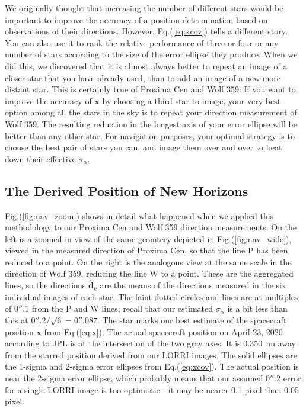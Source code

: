 \documentclass[]{aastex63}
\newcommand{\BV}[1]{\mathbf{#1}}
\newcommand{\BH}[1]{\hat{\mathbf{#1}}}
\begin{document}
We originally thought that increasing the number of different stars would be important to improve the accuracy of a position determination based on observations of their directions.  However, Eq.(\ref{eq:xcov}) tells a different story.  You can also use it to rank the relative performance of three or four or any number of stars according to the size of the error ellipse they produce.  When we did this, we discovered that it is almost always better to repeat an image of a closer star that you have already used, than to add an image of a new more distant star.  This is certainly true of Proxima Cen and Wolf 359: If you want to improve the accuracy of $\BV{x}$ by choosing a third star to image, your very best option among all the stars in the sky is to repeat your direction measurement of Wolf 359.  The resulting reduction in the longest axis of your error ellipse will be better than any other star.  For navigation purposes, your optimal strategy is to choose the best pair of stars you can, and image them over and over to beat down their effective $\sigma_\alpha.$

\subsection{The Derived Position of New Horizons}

Fig.(\ref{fig:nav_zoom}) shows in detail what happened when we applied this methodology to our Proxima Cen and Wolf 359 direction measurements.  On the left is a zoomed-in view of the same geomtery depicted in Fig.(\ref{fig:nav_wide}), viewed in the measured direction of Proxima Cen, so that the line P has been reduced to a point.  On the right is the analogous view at the same scale in the direction of Wolf 359, reducing the line W to a point.  These are the aggregated lines, so the directions $\BH{d}_k$ are the means of the directions measured in the six individual images of each star.  The faint dotted circles and lines are at multiples of $0''\!\!.1$ from the P and W lines; recall that our estimated $\sigma_\alpha$ is a bit less than this at $0''\!\!.2/\sqrt{6}=0''\!\!.087.$ The star marks our best estimate of the spacecraft position $\BV{x}$ from Eq.(\ref{eq:x}).  The actual spacecraft position on April 23, 2020 according to JPL is at the intersection of the two gray axes.  It is 0.350~au away from the starred position derived from our LORRI images. The solid ellipses are the 1-sigma and 2-sigma error ellipses from Eq.(\ref{eq:xcov}).  The actual position is near the 2-sigma error ellipse, which probably means that our assumed $0''\!\!.2$ error for a single LORRI image is too optimistic - it may be nearer 0.1 pixel than 0.05 pixel.
\end{document}
